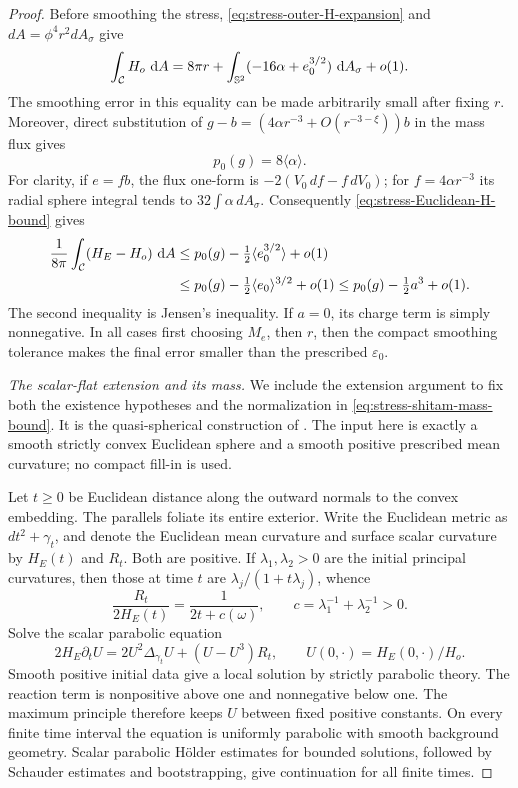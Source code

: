 \begin{proof}
Before smoothing the stress,
\eqref{eq:stress-outer-H-expansion} and
$dA=\phi^4r^2dA_\sigma$ give
\[
 \int_{\mathcal C}H_o\,\mathop{}\!\mathrm d A
 =8\pi r+\int_{\mathbb S^2}(-16\alpha+e_0^{3/2})\,\mathop{}\!\mathrm d A_\sigma+o(1).
\]
The smoothing error in this equality can be made arbitrarily small
after fixing $r$.  Moreover, direct substitution of
$g-b=(4\alpha r^{-3}+O(r^{-3-\xi}))b$ in the mass flux gives
\begin{equation}
 p_0(g)=8\langle\alpha\rangle.
 \label{eq:stress-conformal-mass}
\end{equation}
For clarity, if $e=fb$, the flux one-form is
$-2(V_0\,df-f\,dV_0)$; for $f=4\alpha r^{-3}$ its radial sphere
integral tends to $32\int\alpha\,dA_\sigma$.
Consequently \eqref{eq:stress-Euclidean-H-bound} gives
\begin{align}
 \frac1{8\pi}\int_{\mathcal C}(H_E-H_o)\,\mathop{}\!\mathrm d A
 &\le p_0(g)-\tfrac12\langle e_0^{3/2}\rangle+o(1)\notag\\
 &\le p_0(g)-\tfrac12\langle e_0\rangle^{3/2}+o(1)
 \le p_0(g)-\tfrac12a^3+o(1).
 \label{eq:stress-cubic-budget}
\end{align}
The second inequality is Jensen's inequality.  If $a=0$, its charge
term is simply nonnegative.  In all cases first choosing $M_e$,
then $r$, then the compact smoothing tolerance makes the final error
smaller than the prescribed $\varepsilon_0$.

\emph{The scalar-flat extension and its mass.}
We include the extension argument to fix both the existence hypotheses
and the normalization in \eqref{eq:stress-shitam-mass-bound}.  It is
the quasi-spherical construction of \citet[Section~2, Theorem~2.1,
and Lemma~4.2]{ShiTam2002}.  The input here is exactly a smooth
strictly convex Euclidean sphere and a smooth positive prescribed
mean curvature; no compact fill-in is used.

Let $t\ge0$ be Euclidean distance along the outward normals to the
convex embedding.  The parallels foliate its entire exterior.  Write
the Euclidean metric as $dt^2+\gamma_t$, and denote the Euclidean
mean curvature and surface scalar curvature by $H_E(t)$ and $R_t$.
Both are positive.  If $\lambda_1,\lambda_2>0$ are the initial
principal curvatures, then those at time $t$ are
$\lambda_j/(1+t\lambda_j)$, whence
\begin{equation}
 \frac{R_t}{2H_E(t)}
 =\frac1{2t+c(\omega)},\qquad
 c=\lambda_1^{-1}+\lambda_2^{-1}>0.
 \label{eq:stress-parallel-curvature}
\end{equation}
Solve the scalar parabolic equation
\begin{equation}
 2H_E\partial_tU
 =2U^2\Delta_{\gamma_t}U+(U-U^3)R_t,
 \qquad U(0,\cdot)=H_E(0,\cdot)/H_o.
 \label{eq:stress-quasispherical-equation}
\end{equation}
Smooth positive initial data give a local solution by strictly
parabolic theory.  The reaction term is nonpositive above one and
nonnegative below one.  The maximum principle therefore keeps $U$
between fixed positive constants.  On every finite time interval
the equation is uniformly parabolic with smooth background geometry.
Scalar parabolic H\"older estimates for bounded solutions, followed
by Schauder estimates and bootstrapping, give continuation for all
finite times.


\end{proof}
